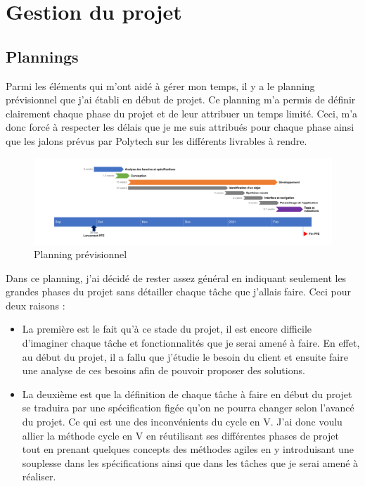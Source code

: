 \documentclass[UTF8]{EPURapport}
\begin{document}
\chapter{Gestion du projet}

\section{Plannings}

Parmi les éléments qui m'ont aidé à gérer mon temps, il y a le planning prévisionnel que j'ai établi en début de projet. Ce planning m'a permis de définir clairement chaque phase du projet et de leur attribuer un temps limité. Ceci, m'a donc forcé à respecter les délais que je me suis attribués pour chaque phase ainsi que les jalons prévus par Polytech sur les différents livrables à rendre. \\

\begin{figure}[h!]
\centering
  \includegraphics[width=\textwidth]{images/PlanningPrev.png}
  \caption{Planning prévisionnel}
  \label{fig:planningprev}
\end{figure}

Dans ce planning, j'ai décidé de rester assez général en indiquant seulement les grandes phases du projet sans détailler chaque tâche que j'allais faire. Ceci pour deux raisons : \\

\begin{itemize}
  \item La première est le fait qu'à ce stade du projet, il est encore difficile d'imaginer chaque tâche et fonctionnalités que je serai amené à faire. En effet, au début du projet, il a fallu que j'étudie le besoin du client et ensuite faire une analyse de ces besoins afin de pouvoir proposer des solutions.
  \item La deuxième est que la définition de chaque tâche à faire en début du projet se traduira par une spécification figée qu'on ne pourra changer selon l'avancé du projet. Ce qui est une des inconvénients du cycle en V. J'ai donc voulu allier la méthode cycle en V en réutilisant ses différentes phases de projet tout en prenant quelques concepts des méthodes agiles en y introduisant une souplesse dans les spécifications ainsi que dans les tâches que je serai amené à réaliser.\\
\end{itemize}
\end{document}
